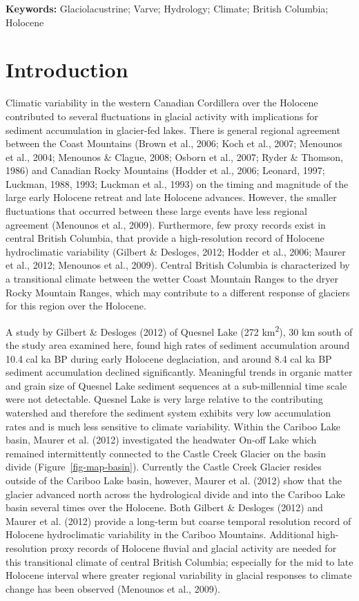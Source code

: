 \documentclass[
  letterpaper,
  DIV=11,
  numbers=noendperiod]{scrartcl}
\begin{document}
\textbf{Keywords:} Glaciolacustrine; Varve; Hydrology; Climate; British
Columbia; Holocene

\pagebreak

\section{Introduction}\label{introduction}

Climatic variability in the western Canadian Cordillera over the
Holocene contributed to several fluctuations in glacial activity with
implications for sediment accumulation in glacier-fed lakes. There is
general regional agreement between the Coast Mountains (Brown et al.,
2006; Koch et al., 2007; Menounos et al., 2004; Menounos \& Clague,
2008; Osborn et al., 2007; Ryder \& Thomson, 1986) and Canadian Rocky
Mountains (Hodder et al., 2006; Leonard, 1997; Luckman, 1988, 1993;
Luckman et al., 1993) on the timing and magnitude of the large early
Holocene retreat and late Holocene advances. However, the smaller
fluctuations that occurred between these large events have less regional
agreement (Menounos et al., 2009). Furthermore, few proxy records exist
in central British Columbia, that provide a high-resolution record of
Holocene hydroclimatic variability (Gilbert \& Desloges, 2012; Hodder et
al., 2006; Maurer et al., 2012; Menounos et al., 2009). Central British
Columbia is characterized by a transitional climate between the wetter
Coast Mountain Ranges to the dryer Rocky Mountain Ranges, which may
contribute to a different response of glaciers for this region over the
Holocene.

A study by Gilbert \& Desloges (2012) of Quesnel Lake (272
km\textsuperscript{2}), 30 km south of the study area examined here,
found high rates of sediment accumulation around 10.4 cal ka BP during
early Holocene deglaciation, and around 8.4 cal ka BP sediment
accumulation declined significantly. Meaningful trends in organic matter
and grain size of Quesnel Lake sediment sequences at a sub-millennial
time scale were not detectable. Quesnel Lake is very large relative to
the contributing watershed and therefore the sediment system exhibits
very low accumulation rates and is much less sensitive to climate
variability. Within the Cariboo Lake basin, Maurer et al. (2012)
investigated the headwater On-off Lake which remained intermittently
connected to the Castle Creek Glacier on the basin divide
(Figure~\ref{fig-map-basin}). Currently the Castle Creek Glacier resides
outside of the Cariboo Lake basin, however, Maurer et al. (2012) show
that the glacier advanced north across the hydrological divide and into
the Cariboo Lake basin several times over the Holocene. Both Gilbert \&
Desloges (2012) and Maurer et al. (2012) provide a long-term but coarse
temporal resolution record of Holocene hydroclimatic variability in the
Cariboo Mountains. Additional high-resolution proxy records of Holocene
fluvial and glacial activity are needed for this transitional climate of
central British Columbia; especially for the mid to late Holocene
interval where greater regional variability in glacial responses to
climate change has been observed (Menounos et al., 2009).
\end{document}
